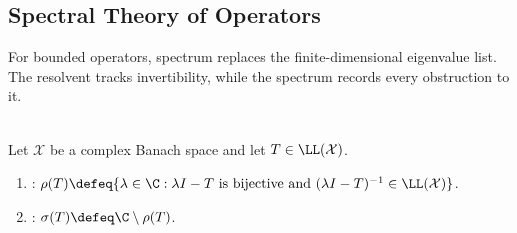 \subsection{Spectral Theory of Operators}

%

For bounded operators, spectrum replaces the finite-dimensional eigenvalue list. The resolvent tracks invertibility, while the spectrum records every obstruction to it.

\begin{definition} \label{def:bounded-operator-spectrum-resolvent} \\
Let $\mathcal{X}$ be a complex Banach space and let $T\in\LL(\mathcal{X})$.
\begin{enumerate}[label=(\roman*)]
\setlength{\itemsep}{0pt}
\item {}: $\rho(T)\defeq\{\lambda\in\C:\lambda I-T\text{ is bijective and }(\lambda I-T)^{-1}\in\LL(\mathcal{X})\}$.
\item {}: $\sigma(T)\defeq\C\setminus\rho(T)$.
\end{enumerate}
\end{definition}


